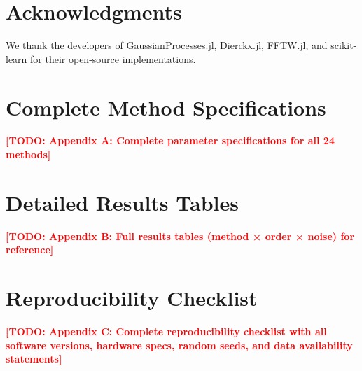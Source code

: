\documentclass[11pt]{article}
\newcommand{\TODO}[1]{\textcolor{red}{\textbf{[TODO: #1]}}}
\begin{document}
\section*{Acknowledgments}
We thank the developers of GaussianProcesses.jl, Dierckx.jl, FFTW.jl, and scikit-learn for their open-source implementations.




\appendix

\section{Complete Method Specifications}
\label{app:methods}
\TODO{Appendix A: Complete parameter specifications for all 24 methods}

\section{Detailed Results Tables}
\label{app:results}
\TODO{Appendix B: Full results tables (method × order × noise) for reference}

\section{Reproducibility Checklist}
\label{app:reproducibility}
\TODO{Appendix C: Complete reproducibility checklist with all software versions, hardware specs, random seeds, and data availability statements}
\end{document}
